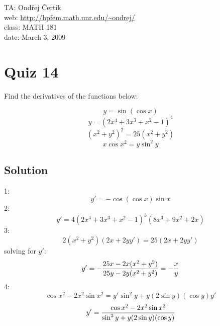 \documentclass[10pt]{article}
\begin{document}
\noindent TA: Ondřej Čertík\\
web: \url{http://hpfem.math.unr.edu/~ondrej/}\\
class: MATH 181\\
date: March 3, 2009

\section*{Quiz 14}

Find the derivatives of the functions below:

$$y=\sin(\cos x)$$
$$y=(2x^4+3x^3+x^2-1)^4$$
$$(x^2+y^2)^2=25(x^2+y^2)$$
$$x\cos x^2 = y\sin^2 y$$

\subsection*{Solution}

1:
$$y'=-\cos(\cos x)\sin x$$
2:
$$y'=4(2x^4+3x^3+x^2-1)^3(8x^3+9x^2+2x)$$
3:
$$2(x^2+y^2)(2x+2yy') = 25(2x+2yy')$$
solving for $y'$:
$$y'=-{25x-2x(x^2+y^2)\over25y-2y(x^2+y^2)}=-{x\over y}$$
4:
$$\cos x^2-2x^2\sin x^2=y'\sin^2 y + y(2\sin y)(\cos y) y'$$
$$y'={\cos x^2-2x^2\sin x^2\over\sin^2 y + y(2\sin y)(\cos y)}$$
\end{document}
